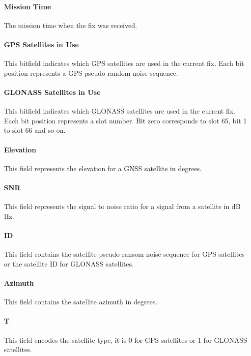 \paragraph{Mission Time}
The mission time when the fix was received.

\paragraph{GPS Satellites in Use}

This bitfield indicates which GPS satellites are used in the current fix. Each
bit position represents a GPS pseudo-random noise sequence.

\paragraph{GLONASS Satellites in Use}
This bitfield indicates which GLONASS satellites are used in the current fix.
Each bit position represents a slot number. Bit zero corresponds to slot 65, bit
1 to slot 66 and so on.

\paragraph{Elevation}
This field represents the elevation for a GNSS satellite in degrees.

\paragraph{SNR}
This field represents the signal to noise ratio for a signal from a satellite in
dB Hz.

\paragraph{ID}
This field contains the satellite pseudo-ransom noise sequence for GPS
satellites or the satellite ID for GLONASS satellites.

\paragraph{Azimuth}
This field contains the satellite azimuth in degrees.

\paragraph{T}
This field encodes the satellite type, it is 0 for GPS satellites or 1 for
GLONASS satellites.


